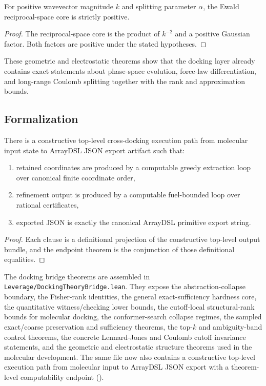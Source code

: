 \begin{theorem}\label{thm:ewald-fourier-positive}
For positive wavevector magnitude $k$ and splitting parameter $\alpha$, the Ewald reciprocal-space core is strictly positive.
\end{theorem}

\begin{proof}
The reciprocal-space core is the product of $k^{-2}$ and a positive Gaussian factor. Both factors are positive under the stated hypotheses.
\end{proof}

These geometric and electrostatic theorems show that the docking layer already contains exact statements about phase-space evolution, force-law differentiation, and long-range Coulomb splitting together with the rank and approximation bounds.

\subsection{Formalization}

\begin{theorem}\label{thm:top-level-computable-export}
There is a constructive top-level cross-docking execution path from molecular input state to ArrayDSL JSON export artifact such that:
\begin{enumerate}
\item retained coordinates are produced by a computable greedy extraction loop over canonical finite coordinate order,
\item refinement output is produced by a computable fuel-bounded loop over rational certificates,
\item exported JSON is exactly the canonical ArrayDSL primitive export string.
\end{enumerate}
\end{theorem}

\begin{proof}
Each clause is a definitional projection of the constructive top-level output bundle, and the endpoint theorem is the conjunction of those definitional equalities.
\end{proof}

The docking bridge theorems are assembled in \texttt{Leverage/DockingTheoryBridge.lean}. They expose the abstraction-collapse boundary, the Fisher-rank identities, the general exact-sufficiency hardness core, the quantitative witness/checking lower bounds, the cutoff-local structural-rank bounds for molecular docking, the conformer-search collapse regimes, the sampled exact/coarse preservation and sufficiency theorems, the top-$k$ and ambiguity-band control theorems, the concrete Lennard-Jones and Coulomb cutoff invariance statements, and the geometric and electrostatic structure theorems used in the molecular development. The same file now also contains a constructive top-level execution path from molecular input to ArrayDSL JSON export with a theorem-level computability endpoint ().
